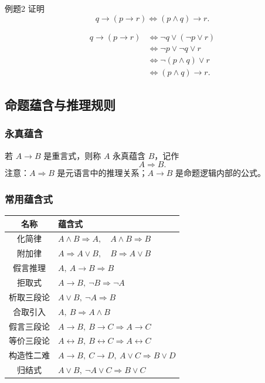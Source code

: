\begin{question}{例题2}
	证明
	\[
	q\to(p\to r)\Leftrightarrow(p\land q)\to r.
	\]
	
	\begin{solution}
	\begin{align*}
	q\to(p\to r)
	&\Leftrightarrow \neg q\lor(\neg p\lor r)\\
	&\Leftrightarrow \neg p\lor\neg q\lor r\\
	&\Leftrightarrow \neg(p\land q)\lor r\\
	&\Leftrightarrow (p\land q)\to r.
	\end{align*}
	\end{solution}
\end{question}

\subsection{命题蕴含与推理规则}

\subsubsection{永真蕴含}

若 \(A\to B\) 是重言式，则称 \(A\) 永真蕴含 \(B\)，记作
\[
A\Rightarrow B.
\]
注意：\(A\Rightarrow B\) 是元语言中的推理关系；\(A\to B\) 是命题逻辑内部的公式。

\subsubsection{常用蕴含式}

\begin{center}
	\begin{tabular}{cl}
		\toprule
		名称 & 蕴含式\\
		\midrule
		化简律 & \(A\land B\Rightarrow A,\quad A\land B\Rightarrow B\)\\
		附加律 & \(A\Rightarrow A\lor B,\quad B\Rightarrow A\lor B\)\\
		假言推理 & \(A,\ A\to B\Rightarrow B\)\\
		拒取式 & \(A\to B,\ \neg B\Rightarrow \neg A\)\\
		析取三段论 & \(A\lor B,\ \neg A\Rightarrow B\)\\
		合取引入 & \(A,\ B\Rightarrow A\land B\)\\
		假言三段论 & \(A\to B,\ B\to C\Rightarrow A\to C\)\\
		等价三段论 & \(A\leftrightarrow B,\ B\leftrightarrow C\Rightarrow A\leftrightarrow C\)\\
		构造性二难 & \(A\to B,\ C\to D,\ A\lor C\Rightarrow B\lor D\)\\
		归结式 & \(A\lor B,\ \neg A\lor C\Rightarrow B\lor C\)\\
		\bottomrule
	\end{tabular}
\end{center}


